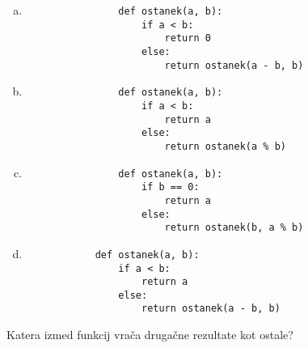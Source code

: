 \documentclass[arhiv, 10pt]{../izpit}
\begin{document}
        \begin{multicols}{2}
        \begin{enumerate}[(a)]
\item 
                \begin{verbatim}
                def ostanek(a, b):
                    if a < b:
                        return 0
                    else:
                        return ostanek(a - b, b)
                \end{verbatim}
            
\item 
                \begin{verbatim}
                def ostanek(a, b):
                    if a < b:
                        return a
                    else:
                        return ostanek(a % b)
                \end{verbatim}
            
\item 
                \begin{verbatim}
                def ostanek(a, b):
                    if b == 0:
                        return a
                    else:
                        return ostanek(b, a % b)
                \end{verbatim}
            
\item 
            \begin{verbatim}
            def ostanek(a, b):
                if a < b:
                    return a
                else:
                    return ostanek(a - b, b)
            \end{verbatim}
        
\end{enumerate}

        \end{multicols}
    
        \naloga*
        
        Katera izmed funkcij vrača drugačne rezultate kot ostale?
    
\end{document}
